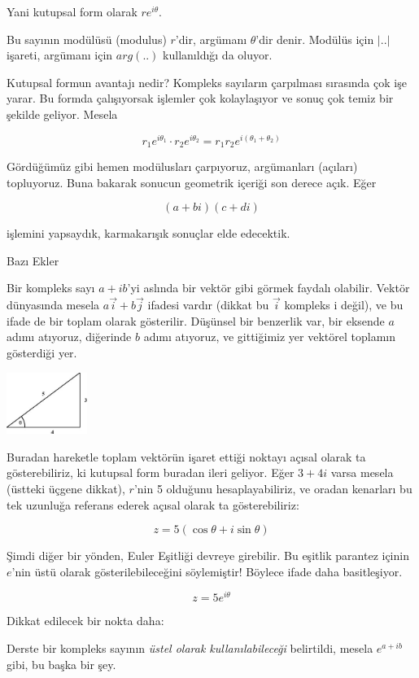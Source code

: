 \documentclass[12pt,fleqn]{article}\usepackage{../../common}
\begin{document}
Yani kutupsal form olarak $re^{i\theta}$. 

Bu sayının modülüsü (modulus) $r$'dir, argümanı $\theta$'dir denir. Modülüs
için $|..|$ işareti, argümanı için $arg(..)$ kullanıldığı da oluyor.

Kutupsal formun avantajı nedir? Kompleks sayıların çarpılması sırasında çok
işe yarar. Bu formda çalışıyorsak işlemler çok kolaylaşıyor ve sonuç çok
temiz bir şekilde geliyor. Mesela

$$ r_1 e^{i\theta_1} \cdot r_2 e^{i\theta_2} = r_1r_2 e^{i(\theta_1+\theta_2)}$$

Gördüğümüz gibi hemen modülusları çarpıyoruz, argümanları (açıları)
topluyoruz. Buna bakarak sonucun geometrik içeriği son derece açık. Eğer 

$$ (a+bi)(c+di) $$

işlemini yapsaydık, karmakarışık sonuçlar elde edecektik.

Bazı Ekler 

Bir kompleks sayı $a+ib$'yi aslında bir vektör gibi görmek faydalı
olabilir. Vektör dünyasında mesela $a\vec{i} + b\vec{j}$ ifadesi vardır
(dikkat bu $\vec{i}$ kompleks i değil), ve bu ifade de bir toplam olarak
gösterilir. Düşünsel bir benzerlik var, bir eksende $a$ adımı atıyoruz,
diğerinde $b$ adımı atıyoruz, ve gittiğimiz yer vektörel toplamın
gösterdiği yer.

\includegraphics[height=2cm]{345.png}

Buradan hareketle toplam vektörün işaret ettiği noktayı açısal olarak ta
gösterebiliriz, ki kutupsal form buradan ileri geliyor. Eğer $3 + 4i$ varsa
mesela (üstteki üçgene dikkat), $r$'nin 5 olduğunu hesaplayabiliriz, ve
oradan kenarları bu tek uzunluğa referans ederek açısal olarak ta
gösterebiliriz:

$$ z = 5(\cos\theta + i \sin\theta ) $$

Şimdi diğer bir yönden, Euler Eşitliği devreye girebilir. Bu eşitlik
parantez içinin $e$'nin üstü olarak gösterilebileceğini söylemiştir!
Böylece ifade daha basitleşiyor.

$$ z = 5e^{i\theta} $$

Dikkat edilecek bir nokta daha:

Derste bir kompleks sayının {\em üstel olarak kullanılabileceği}
belirtildi, mesela $e^{a+ib}$ gibi, bu başka bir şey. 
\end{document}
